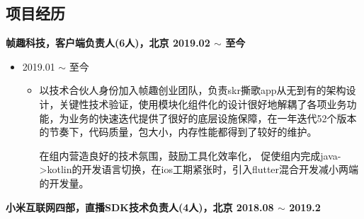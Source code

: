 \documentclass[line,margin,UTF8]{res}
\begin{document}
 
\address{763585627@qq.com}
\address{15718887533}

\begin{resume}
 


\section{项目经历} 
{\bf 帧趣科技，客户端负责人(6人)，北京 \hfill  2019.02 $\sim$ 至今}
 \vspace{0pt}

  \begin{itemize}
 \item {} 2019.01 $\sim$ 至今
 	\vspace{0pt}
 	\begin{itemize}
 		\item
 		以技术合伙人身份加入帧趣创业团队，负责skr撕歌app从无到有的架构设计，关键性技术验证，使用模块化组件化的设计很好地解耦了各项业务功能，为业务的快速迭代提供了很好的底层设施保障，在一年迭代52个版本的节奏下，代码质量，包大小，内存性能都得到了较好的维护。

		在组内营造良好的技术氛围，鼓励工具化效率化，
		促使组内完成java->kotlin的开发语言切换，在ios工期紧张时，引入flutter混合开发减小两端的开发量。

 \end{itemize}
 \end{itemize}

{\bf 小米互联网四部，直播SDK技术负责人(4人)，北京 \hfill  2018.08 $\sim$ 2019.2}
 \vspace{0pt}


\end{resume}
\end{document}
